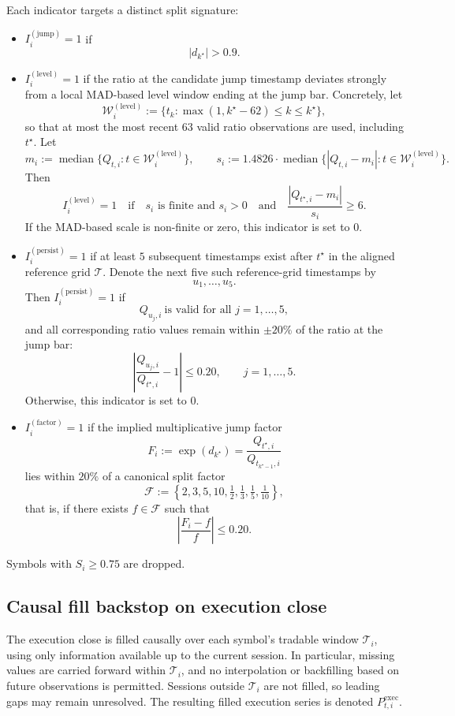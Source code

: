 \documentclass[11pt,a4paper]{article}
\begin{document}
Each indicator targets a distinct split signature:
\begin{itemize}[itemsep=2pt,topsep=4pt]
\item
\(I_i^{(\mathrm{jump})}=1\) if
\[
|d_{k^\star}|>0.9.
\]

\item
\(I_i^{(\mathrm{level})}=1\) if the ratio at the candidate jump timestamp
deviates strongly from a local MAD-based level window ending at the jump bar.
Concretely, let
\[
\mathcal W_i^{(\mathrm{level})}
:=
\{t_k:\max(1,k^\star-62)\le k\le k^\star\},
\]
so that at most the most recent \(63\) valid ratio observations are used,
including \(t^\star\). Let
\[
m_i:=\operatorname{median}\{Q_{t,i}:t\in\mathcal W_i^{(\mathrm{level})}\},
\qquad
s_i:=1.4826\cdot
\operatorname{median}\{|Q_{t,i}-m_i|:t\in\mathcal W_i^{(\mathrm{level})}\}.
\]
Then
\[
I_i^{(\mathrm{level})}=1
\quad\text{if}\quad
s_i \text{ is finite and } s_i>0
\quad\text{and}\quad
\frac{|Q_{t^\star,i}-m_i|}{s_i}\ge 6.
\]
If the MAD-based scale is non-finite or zero, this indicator is set to \(0\).

\item
\(I_i^{(\mathrm{persist})}=1\) if at least \(5\) subsequent timestamps exist
after \(t^\star\) in the aligned reference grid \(\mathcal T\). Denote the next
five such reference-grid timestamps by
\[
u_{1},\dots,u_{5}.
\]
Then \(I_i^{(\mathrm{persist})}=1\) if
\[
Q_{u_j,i}\ \text{is valid for all } j=1,\dots,5,
\]
and all corresponding ratio values remain within \(\pm 20\%\) of the ratio at
the jump bar:
\[
\left|
\frac{Q_{u_j,i}}{Q_{t^\star,i}}-1
\right|
\le 0.20,
\qquad j=1,\dots,5.
\]
Otherwise, this indicator is set to \(0\).

\item
\(I_i^{(\mathrm{factor})}=1\) if the implied multiplicative jump factor
\[
F_i:=\exp(d_{k^\star})
=\frac{Q_{t^\star,i}}{Q_{t_{k^\star-1},i}}
\]
lies within \(20\%\) of a canonical split factor
\[
\mathcal F:=\left\{2,3,5,10,\tfrac12,\tfrac13,\tfrac15,\tfrac1{10}\right\},
\]
that is, if there exists \(f\in\mathcal F\) such that
\[
\left|\frac{F_i-f}{f}\right|\le 0.20.
\]
\end{itemize}

Symbols with \(S_i\ge 0.75\) are dropped.

\subsection{Causal fill backstop on execution close}

The execution close is filled causally over each symbol's tradable window
\(\mathcal T_i\), using only information available up to the current session.
In particular, missing values are carried forward within \(\mathcal T_i\), and
no interpolation or backfilling based on future observations is permitted.
Sessions outside \(\mathcal T_i\) are not filled, so leading gaps may remain
unresolved. The resulting filled execution series is denoted
\(P^{\mathrm{exec}}_{t,i}\).
\end{document}
